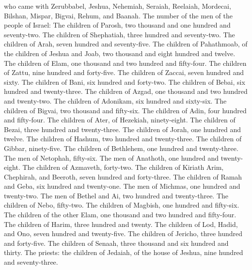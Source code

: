  who came with Zerubbabel, Jeshua, Nehemiah, Seraiah,
Reelaiah, Mordecai, Bilshan, Mispar, Bigvai, Rehum, and Baanah. The
number of the men of the people of Israel:  The children
of Parosh, two thousand and one hundred and seventy-two. 
The children of Shephatiah, three hundred and seventy-two.
 The children of Arah, seven hundred and seventy-five.
 The children of Pahathmoab, of the children of Jeshua and
Joab, two thousand and eight hundred and twelve.  The
children of Elam, one thousand and two hundred and fifty-four.
 The children of Zattu, nine hundred and forty-five.
 The children of Zaccai, seven hundred and sixty.
 The children of Bani, six hundred and forty-two.
 The children of Bebai, six hundred and twenty-three.
 The children of Azgad, one thousand and two hundred and
twenty-two.  The children of Adonikam, six hundred and
sixty-six.  The children of Bigvai, two thousand and
fifty-six.  The children of Adin, four hundred and
fifty-four.  The children of Ater, of Hezekiah,
ninety-eight.  The children of Bezai, three hundred and
twenty-three.  The children of Jorah, one hundred and
twelve.  The children of Hashum, two hundred and
twenty-three.  The children of Gibbar, ninety-five.
 The children of Bethlehem, one hundred and twenty-three.
 The men of Netophah, fifty-six.  The men
of Anathoth, one hundred and twenty-eight.  The children
of Azmaveth, forty-two.  The children of Kiriath Arim,
Chephirah, and Beeroth, seven hundred and forty-three. 
The children of Ramah and Geba, six hundred and twenty-one.
 The men of Michmas, one hundred and twenty-two.
 The men of Bethel and Ai, two hundred and twenty-three.
 The children of Nebo, fifty-two.  The
children of Magbish, one hundred and fifty-six.  The
children of the other Elam, one thousand and two hundred and fifty-four.
 The children of Harim, three hundred and twenty.
 The children of Lod, Hadid, and Ono, seven hundred and
twenty-five.  The children of Jericho, three hundred and
forty-five.  The children of Senaah, three thousand and
six hundred and thirty.  The priests: the children of
Jedaiah, of the house of Jeshua, nine hundred and seventy-three.
